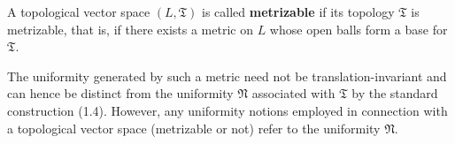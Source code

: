 A topological vector space $(L, \mathfrak{T})$ is called \textbf{metrizable} if its topology $\mathfrak{T}$ is metrizable, that is, if there exists a metric on $L$ whose open balls form a base for $\mathfrak{T}$.

The uniformity generated by such a metric need not be translation-invariant and can hence be distinct from the uniformity $\mathfrak{N}$ associated with $\mathfrak{T}$ by the standard construction (1.4). However, any uniformity notions employed in connection with a topological vector space (metrizable or not) refer to the uniformity $\mathfrak{N}$.
